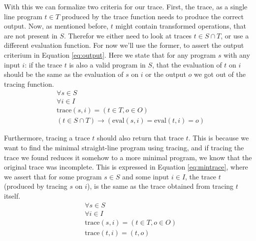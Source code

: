         With this we can formalize two criteria for our trace.
        First, the trace, as a single line program $t\in T$ produced by the trace function needs to produce the correct output.
        Now, as mentioned before, $t$ might contain transformed operations, that are not present in $S$.
        Therefor we either need to look at traces $t\in S\cap T$, or use a different evaluation function.
        For now we'll use the former, to assert the output criterium in Equation \ref{eq:output}.
        Here we state that for any program $s$ with any input $i$: if the trace $t$ is also a valid program in $S$, that the evaluation of $t$ on $i$ should be the same as the evaluation of $s$ on $i$ or the output $o$ we got out of the tracing function.
        \begin{equation}
            \begin{aligned}
                &\forall s\in S\\
                &\forall i\in I\\
                &\text{trace}(s,i)=(t\in T,o\in O)\\
                &(t\in S\cap T)\to(\text{eval}(s,i)=\text{eval}(t,i)=o)
            \end{aligned}
            \label{eq:output}
        \end{equation}

        Furthermore, tracing a trace $t$ should also return that trace $t$.
        This is because we want to find the minimal straight-line program using tracing, and if tracing the trace we found reduces it somehow to a more minimal program, we know that the original trace was incomplete.
        This is expressed in Equation \ref{eq:mintrace}, where we assert that for some program $s\in S$ and some input $i\in I$, the trace $t$ (produced by tracing $s$ on $i$), is the same as the trace obtained from tracing $t$ itself.
        \begin{equation}
            \begin{aligned}
                &\forall s\in S\\
                &\forall i\in I\\
                &\text{trace}(s,i)=(t\in T,o\in O)\\
                &\text{trace}(t,i)=(t,o)
            \end{aligned}
            \label{eq:mintrace}
        \end{equation}

